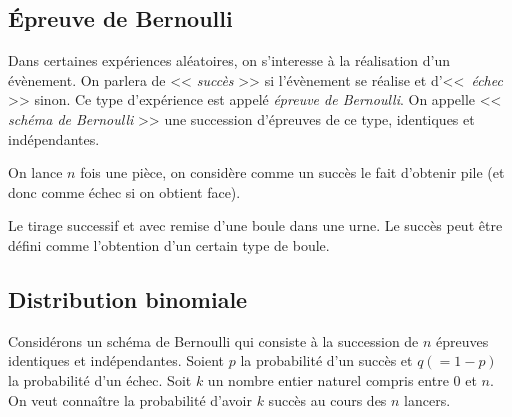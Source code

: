                   \subsection{\'Epreuve de Bernoulli}
                        Dans certaines exp\'eriences al\'eatoires, 
                        on s'interesse \`a la r\'ealisation d'un \'ev\`enement.
                        On parlera de << \emph{succ\`es} >> si l'\'ev\`enement se r\'ealise
                        et d'<<~\emph{\'echec} >> sinon.
                        Ce type d'exp\'erience est appel\'e \emph{\'epreuve de Bernoulli}.
                        On appelle << \emph{sch\'ema de Bernoulli} >> une succession d'\'epreuves de ce type, identiques et ind\'ependantes.
                        \begin{ex}
                              On lance $n$ fois une pi\`ece,
                              on consid\`ere comme un succ\`es le fait d'obtenir pile
                              (et donc comme \'echec si on obtient face).
                              
                              Le tirage successif et avec remise d'une boule dans une urne.
                              Le succ\`es peut \^etre d\'efini comme l'obtention d'un certain type de boule.
                        \end{ex}
                  \subsection{Distribution binomiale}
                        Consid\'erons un sch\'ema de Bernoulli qui 
                        consiste \`a la succession de $n$ \'epreuves identiques et ind\'ependantes.
                        Soient $p$ la probabilit\'e d'un succ\`es et $q ( = 1-p)$ la probabilit\'e d'un \'echec.
                        Soit $k$ un nombre entier naturel compris entre $0$ et $n$.
                        On veut conna\^itre la probabilit\'e d'avoir $k$ succ\`es au cours des $n$ lancers.
                        
